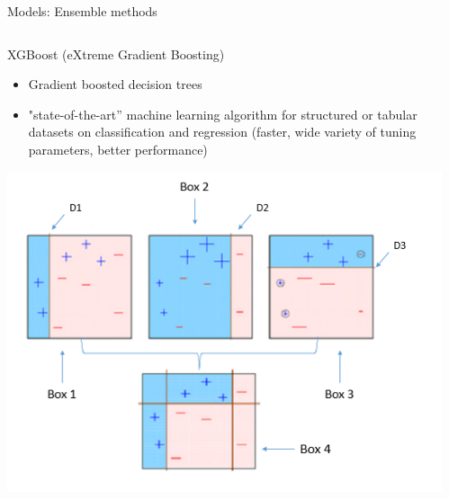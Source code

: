 \documentclass{if-beamer}
\begin{document}
  
\begin{frame}{Models:  Ensemble methods} 

  \begin{columns}
   \begin{column}{0.5\textwidth} 
   \begin{exampleblock}{XGBoost (eXtreme Gradient Boosting)}
   \begin{itemize}
   
   \item  Gradient boosted decision trees
   \item "state-of-the-art” machine learning algorithm for structured or tabular datasets on classification and regression
   (faster, wide variety of tuning parameters, better performance)
      \end{itemize}
      \end{exampleblock}
      
   \includegraphics[scale=0.25]{./figs/boosting.png} 

   \end{column} 
    
   \begin{column}{0.5\textwidth}
 

\end{column}
\end{columns}
\end{frame}
\end{document}
